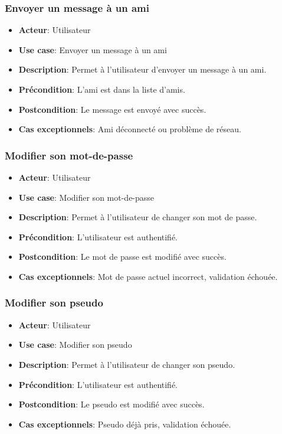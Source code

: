 \documentclass{article}
\begin{document}
\subsubsection*{Envoyer un message à un ami}
\begin{itemize}
    \item \textbf{Acteur}: Utilisateur
    \item \textbf{Use case}: Envoyer un message à un ami
    \item \textbf{Description}: Permet à l'utilisateur d'envoyer un message à un ami.
    \item \textbf{Précondition}: L'ami est dans la liste d'amis.
    \item \textbf{Postcondition}: Le message est envoyé avec succès.
    \item \textbf{Cas exceptionnels}: Ami déconnecté ou problème de réseau.
\end{itemize}

\subsubsection*{Modifier son mot-de-passe}
\begin{itemize}
    \item \textbf{Acteur}: Utilisateur
    \item \textbf{Use case}: Modifier son mot-de-passe
    \item \textbf{Description}: Permet à l'utilisateur de changer son mot de passe.
    \item \textbf{Précondition}: L'utilisateur est authentifié.
    \item \textbf{Postcondition}: Le mot de passe est modifié avec succès.
    \item \textbf{Cas exceptionnels}: Mot de passe actuel incorrect, validation échouée.
\end{itemize}

\subsubsection*{Modifier son pseudo}
\begin{itemize}
    \item \textbf{Acteur}: Utilisateur
    \item \textbf{Use case}: Modifier son pseudo
    \item \textbf{Description}: Permet à l'utilisateur de changer son pseudo.
    \item \textbf{Précondition}: L'utilisateur est authentifié.
    \item \textbf{Postcondition}: Le pseudo est modifié avec succès.
    \item \textbf{Cas exceptionnels}: Pseudo déjà pris, validation échouée.
\end{itemize}
\end{document}
